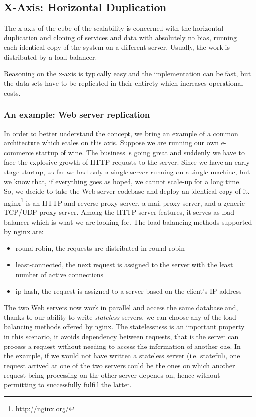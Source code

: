 \subsection{X-Axis: Horizontal Duplication}

The x-axis of the cube of the scalability is concerned with the horizontal
duplication and cloning of services and data with absolutely no bias, running
each identical copy of the system on a different server. Usually, the work is
distributed by a load balancer.

Reasoning on the x-axis is typically easy and the implementation can be fast,
but the data sets have to be replicated in their entirety which increases
operational costs.

\subsubsection{An example: Web server replication}
In order to better understand the concept, we bring an example of a common
architecture which scales on this axis. Suppose we are running our own
e-commerce startup of wine. The business is going great and suddenly we have to
face the explosive growth of HTTP requests to the server. Since we have an early
stage startup, so far we had only a single server running on a single machine,
but we know that, if everything goes as hoped, we cannot scale-up for a long
time. So, we decide to take the Web server codebase and deploy an identical copy
of it. nginx\footnote{\url{http://nginx.org/}} is an HTTP and reverse proxy
server, a mail proxy server, and a generic TCP/UDP proxy server. Among the HTTP
server features, it serves as load balancer which is what we are looking for.
The load balancing methods supported by nginx are:

\begin{itemize}
  \item round-robin, the requests are distributed in round-robin
  \item least-connected, the next request is assigned to the server with the
  least number of active connections
  \item ip-hash, the request is assigned to a server based on the client's IP
  address
\end{itemize}

The two Web servers now work in parallel and access the same database and,
thanks to our ability to write \emph{stateless} servers, we can choose any of
the load balancing methods offered by nginx. The statelessness is an important
property in this scenario, it avoids dependency between requests, that is the
server can process a request without needing to access the information of
another one. In the example, if we would not have written a stateless server
(i.e. stateful), one request arrived at one of the two servers could be the ones
on which another request being processing on the other server depends on, hence
without permitting to successfully fulfill the latter.

